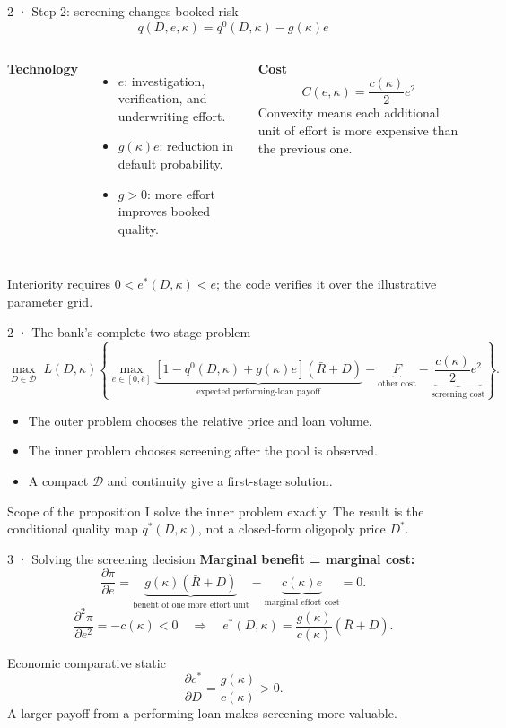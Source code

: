 \documentclass[aspectratio=169,11pt]{beamer}
\begin{document}
\begin{frame}{2 · Step 2: screening changes booked risk}
  \[
    \boxed{q(D,e,\kappa)=q^0(D,\kappa)-g(\kappa)e}
  \]
  \begin{columns}[T,onlytextwidth]
      \textbf{Technology}
      \begin{itemize}
        \item \(e\): investigation, verification, and underwriting effort.
        \item \(g(\kappa)e\): reduction in default probability.
        \item \(g>0\): more effort improves booked quality.
      \end{itemize}
      \textbf{Cost}
      \[
        C(e,\kappa)=\frac{c(\kappa)}{2}e^2
      \]
      Convexity means each additional unit of effort is more expensive than
      the previous one.
  \end{columns}
  \vfill
  \footnotesize Interiority requires \(0<e^*(D,\kappa)<\bar e\); the code
  verifies it over the illustrative parameter grid.
\end{frame}

\begin{frame}{2 · The bank's complete two-stage problem}
  \small
  \[
  \max_{D\in\mathcal D}\;L(D,\kappa)
  \left\{\max_{e\in[0,\bar e]}
  \underbrace{[1-q^0(D,\kappa)+g(\kappa)e](\bar R+D)}_{\text{expected performing-loan payoff}}
  -\underbrace{F}_{\text{other cost}}
  -\underbrace{\frac{c(\kappa)}2e^2}_{\text{screening cost}}
  \right\}.
  \]
  \begin{itemize}
    \item The outer problem chooses the relative price and loan volume.
    \item The inner problem chooses screening after the pool is observed.
    \item A compact \(\mathcal D\) and continuity give a first-stage solution.
  \end{itemize}
  \vfill
  \begin{alertblock}{Scope of the proposition}
    I solve the inner problem exactly. The result is the conditional quality
    map \(q^*(D,\kappa)\), not a closed-form oligopoly price \(D^*\).
  \end{alertblock}
\end{frame}

\begin{frame}{3 · Solving the screening decision}
  \textbf{Marginal benefit = marginal cost:}
  \[
    \frac{\partial\pi}{\partial e}
    =\underbrace{g(\kappa)(\bar R+D)}_{\text{benefit of one more effort unit}}
    -\underbrace{c(\kappa)e}_{\text{marginal effort cost}}=0.
  \]
  \[
    \frac{\partial^2\pi}{\partial e^2}=-c(\kappa)<0
    \quad\Rightarrow\quad
    \boxed{e^*(D,\kappa)=\frac{g(\kappa)}{c(\kappa)}(\bar R+D)}.
  \]
  \vfill
  \begin{block}{Economic comparative static}
    \[
      \frac{\partial e^*}{\partial D}=\frac{g(\kappa)}{c(\kappa)}>0.
    \]
    A larger payoff from a performing loan makes screening more valuable.
  \end{block}
\end{frame}
\end{document}
